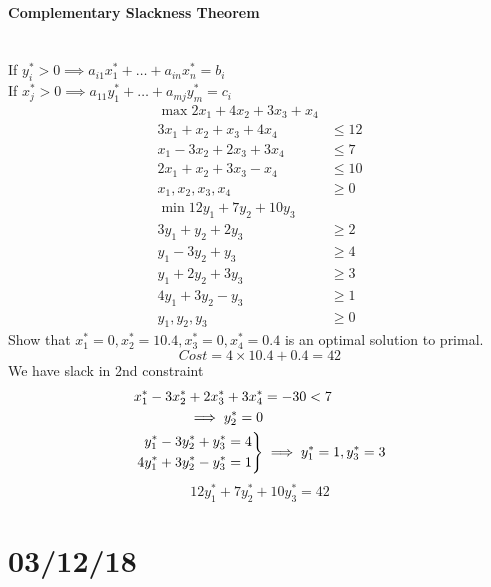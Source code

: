 \documentclass[12 pt]{article}
\newenvironment{rcases}
  {\left.\begin{aligned}}
  {\end{aligned}\right\rbrace}
\begin{document}
          \paragraph{Complementary Slackness Theorem}
          ~\\ If $y_i^* > 0 \implies a_{i1}x_1^*+\ldots+a_{in}x_n^* = b_i$
          \\ If $x_j^* > 0 \implies a_{11}y_1^*+\ldots+a_{mj}y_m^* =
          c_i$
          \begin{align*}
            \max 2x_1 + 4x_2 + 3x_3 + x_4 &
            \\ 3x_1 + x_2 + x_3 + 4x_4 & \leq 12
            \\ x_1 - 3x_2 + 2x_3 + 3x_4 & \leq 7
            \\ 2x_1 + x_2 + 3x_3 - x_4 & \leq 10
            \\ x_1, x_2, x_3, x_4 & \geq 0
            \\ \min 12y_1 + 7y_2 + 10y_3 &
            \\ 3y_1 + y_2 + 2y_3 & \geq 2
            \\ y_1 - 3y_2 + y_3 & \geq 4
            \\ y_1 + 2y_2 + 3y_3 & \geq 3
            \\ 4y_1 + 3y_2 - y_3 & \geq 1
            \\ y_1, y_2, y_3 & \geq 0
          \end{align*}
          Show that $x_1^* =0, x_2^* = 10.4, x_3^* = 0, x_4^* = 0.4$
          is an optimal solution to primal.
          $$ Cost = 4 \times 10.4 + 0.4 = 42$$
          We have slack in 2nd constraint
          \begin{align*}
            x_1^* - 3x_2^* + 2x_3^* + 3x_4^* & = -30 < 7
            \\ \implies y_2^* = 0
            \\
            \begin{rcases}
              y_1^* - 3y_2^* + y_3^* = 4
              \\ 4y_1^* + 3y_2^* - y_3^* = 1
            \end{rcases}
            & \implies y_1^* = 1, y_3^* = 3
          \end{align*}
          $$12y_1^* + 7y_2^* + 10y_3^* = 42$$
          \section{03/12/18}
\end{document}
